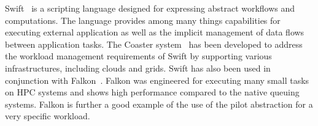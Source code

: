 \documentclass{sig-alternate}
\begin{document}
Swift~\cite{Wilde2011} is a scripting language designed for expressing abstract
workflows and computations. The language provides among many things
capabilities for executing external application as well as the implicit
management of data flows between application tasks.
The Coaster system~\cite{coasters} has been developed to address the workload
management requirements of Swift by supporting various infrastructures,
including clouds and grids.
Swift has also been used in conjunction with Falkon~\cite{1362680}.
Falkon was engineered for executing many small tasks on HPC systems and shows
high performance compared to the native queuing systems. Falkon is further a
good example of the use of the pilot abstraction for a very specific workload.
\end{document}
